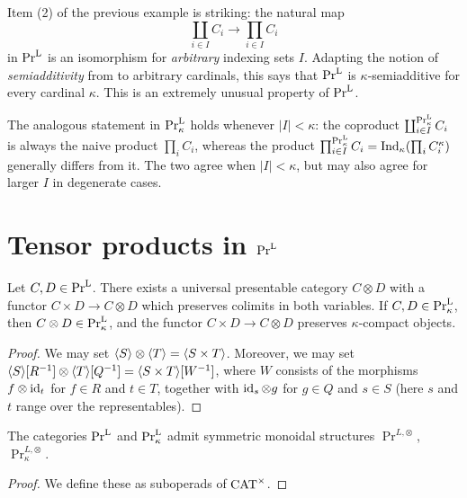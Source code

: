 \documentclass[11pt]{book}
\begin{document}
	\begin{remark}
		Item (2) of the previous example is striking: the natural map
		\[
			\coprod_{i \in I} C_i \to \prod_{i \in I} C_i
		\]
		in $\textup{Pr}^{\textup{L}}$ is an isomorphism for \emph{arbitrary} indexing sets $I$. Adapting the notion of \emph{semiadditivity} from \cite[Definition 6.1.6.13]{lurie2016HA} to arbitrary cardinals, this says that $\textup{Pr}^{\textup{L}}$ is $\kappa$-semiadditive for every cardinal $\kappa$. This is an extremely unusual property of $\textup{Pr}^{\textup{L}}$.

		The analogous statement in $\textup{Pr}^{\textup{L}}_{\kappa}$ holds whenever $|I| < \kappa$: the coproduct $\coprod_{i \in I}^{\textup{Pr}^{\textup{L}}_{\kappa}} C_i$ is always the naive product $\prod_i C_i$, whereas the product $\prod_{i \in I}^{\textup{Pr}^{\textup{L}}_{\kappa}} C_i = \operatorname{Ind}_{\kappa}(\prod_i C_i^{\kappa})$ generally differs from it. The two agree when $|I| < \kappa$, but may also agree for larger $I$ in degenerate cases.
	\end{remark}

	\section{Tensor products in \texorpdfstring{$\textup{Pr}^{\textup{L}}$}{Pr\textasciicircum L}}

	\begin{proposition}
		Let $C,D \in \textup{Pr}^{\textup{L}}$. There exists a universal presentable category $C \otimes D$ with a functor $C \times D \to C \otimes D$ which preserves colimits in both variables. If $C,D \in \textup{Pr}^{\textup{L}}_{\kappa}$, then $C \otimes D \in \textup{Pr}^{\textup{L}}_{\kappa}$, and the functor $C \times D \to C \otimes D$ preserves $\kappa$-compact objects.
	\end{proposition}

	\begin{proof}
		We may set $\langle S \rangle \otimes \langle T \rangle = \langle S \times T \rangle$. Moreover, we may set $\langle S \rangle[R^{-1}] \otimes \langle T \rangle[Q^{-1}] = \langle S \times T \rangle[W^{-1}]$, where $W$ consists of the morphisms $f \otimes \operatorname{id}_t$ for $f \in R$ and $t \in T$, together with $\operatorname{id}_s \otimes g$ for $g \in Q$ and $s \in S$ (here $s$ and $t$ range over the representables).
	\end{proof}

	\begin{corollary}
		The categories $\textup{Pr}^{\textup{L}}$ and $\textup{Pr}^{\textup{L}}_{\kappa}$ admit symmetric monoidal structures $\Pr^{L,\otimes}$, $\Pr^{L,\otimes}_{\kappa}$.
	\end{corollary}

	\begin{proof}
		We define these as suboperads of ${\textup{CAT}}^{\times}$.
	\end{proof}
\end{document}
